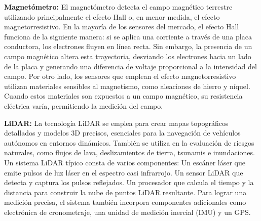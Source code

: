 \textbf{Magnetómetro:}
El magnetómetro detecta el campo magnético terrestre utilizando principalmente el efecto Hall o, en menor medida, el efecto magnetorresistivo. En la mayoría de los sensores del mercado, el efecto Hall funciona de la siguiente manera: si se aplica una corriente a través de una placa conductora, los electrones fluyen en línea recta. Sin embargo, la presencia de un campo magnético altera esta trayectoria, desviando los electrones hacia un lado de la placa y generando una diferencia de voltaje proporcional a la intensidad del campo. Por otro lado, los sensores que emplean el efecto magnetorresistivo utilizan materiales sensibles al magnetismo, como aleaciones de hierro y níquel. Cuando estos materiales son expuestos a un campo magnético, su resistencia eléctrica varía, permitiendo la medición del campo.
\vspace{10pt}  %



\textbf{LiDAR:}
La tecnología LiDAR se emplea para crear mapas topográficos detallados y modelos 3D precisos, esenciales para la navegación de vehículos autónomos en entornos dinámicos. También se utiliza en la evaluación de riesgos naturales, como flujos de lava, deslizamientos de tierra, tsunamis e inundaciones.
Un sistema LiDAR típico consta de varios componentes:
Un escáner láser que emite pulsos de luz láser en el espectro casi infrarrojo.
Un sensor LiDAR que detecta y captura los pulsos reflejados.
Un procesador que calcula el tiempo y la distancia para construir la nube de puntos LiDAR resultante.
Para lograr una medición precisa, el sistema también incorpora componentes adicionales como electrónica de cronometraje, una unidad de medición inercial (IMU) y un GPS.

